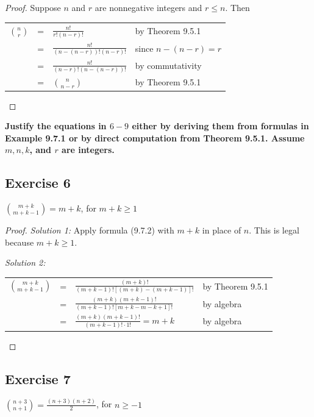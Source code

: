 \documentclass[14pt]{extarticle}
\newcommand{\dps}{\displaystyle}
\newcommand{\cy}{\color{cyan}}
\begin{document}
\begin{proof}
     Suppose \(n\) and \(r\) are nonnegative integers and \(r \leq n\). Then
     \begin{center}
          \begin{tabular}{rcll}
               \(\dps\binom{n}{r}\) & = & \(\dps\frac{n!}{r!(n-r)!}\)         & {\cy by Theorem 9.5.1}      \\
                                    & = & \(\dps\frac{n!}{(n-(n-r))!(n-r)!}\) & {\cy since \(n-(n-r) = r\)} \\
                                    & = & \(\dps\frac{n!}{(n-r)!(n-(n-r))!}\) & {\cy by commutativity}      \\
                                    & = & \(\dps\binom{n}{n-r}\)              & {\cy by Theorem 9.5.1}
          \end{tabular}
     \end{center}
\end{proof}

{\bf \cy Justify the equations in \(6-9\) either by deriving them from formulas in Example 9.7.1 or by direct computation
from Theorem 9.5.1. Assume \(m, n, k\), and \(r\) are integers.}

\subsection{Exercise 6}
\(\dps\binom{m+k}{m+k-1} = m+k\), for \(m+k \geq 1\)
\begin{proof}
     {\it Solution 1:} Apply formula (9.7.2) with \(m + k\) in place of \(n\). This is legal because \(m + k \geq 1\).

          {\it Solution 2:}
     \begin{center}
          \begin{tabular}{rcll}
               \(\dps\binom{m+k}{m+k-1}\) & = & \(\dps\frac{(m+k)!}{(m+k-1)![(m+k)-(m+k-1)]!}\)       & {\cy by Theorem 9.5.1} \\
                                          & = & \(\dps\frac{(m+k)(m+k-1)!}{(m+k-1)![m+k-m-k+1]!}\)    & {\cy by algebra}       \\
                                          & = & \(\dps\frac{(m+k)(m+k-1)!}{(m+k-1)! \cdot 1!} = m+k\) & {\cy by algebra}
          \end{tabular}
     \end{center}
\end{proof}

\subsection{Exercise 7}
\(\dps\binom{n+3}{n+1} = \frac{(n+3)(n+2)}{2}\), for \(n \geq -1\)
\end{document}
